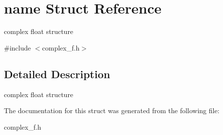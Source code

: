 \hypertarget{structname}{}\section{name Struct Reference}
\label{structname}


complex float structure  




{\ttfamily \#include $<$complex\+\_\+f.\+h$>$}



\subsection{Detailed Description}
complex float structure 

The documentation for this struct was generated from the following file\+:\begin{DoxyCompactItemize}
\item 
complex\+\_\+f.\+h\end{DoxyCompactItemize}
